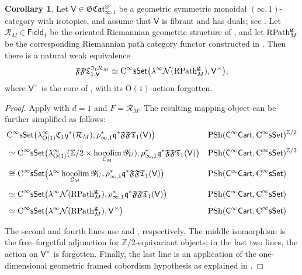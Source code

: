 \documentclass{amsart}
\newcommand{\cat}[1]{\mathsf{#1}}
\newcommand{\sset}{\cat{sSet}}
\newcommand{\nerve}{\mathcal{N}}
\newcommand{\we}{\simeq}
\DeclareMathOperator*{\hocolim}{hocolim}
\newcommand{\CsSet}{\textnormal{C}^{\infty}\sset}
\newcommand{\fieldnoniso}[1]{\cat{Field}_{#1}}
\newcommand{\Cart}{\cat{C}^{\infty}\cat{Cart}}
\newcommand{\FFT}{\mathfrak{FFT}}
\newcommand{\GCat}{\mathfrak{G}\mathfrak{Cat}}
\newcommand{\sheaf}[1]{\mathcal{#1}}
\newcommand{\psh}{\mathrm{PSh}}
\newcommand{\RM}{\sheaf{R}_{M}}
\newcommand{\CM}{{\sheaf{C}}_{M}}
\newcommand{\Cc}{\mathfrak{C}}
\newcommand{\ZZ}{{\mathbb{Z}}}
\newcommand{\rpathgermy}{{\mathrm{RPath}}^{\textnormal{\textbf{g}}}_{M}}
\newcommand{\Yo}{\mathscr{Y}}
\theoremstyle{definition}
\newtheorem{corollary}[equation]{Corollary}
\numberwithin{equation}{subsection}
\numberwithin{subsubsection}{subsection}
\begin{document}
\begin{corollary}\label{cor:one-dimensional.Riemannian.classification}
  Let \(\cat{V}\in\GCat_{\infty,1}^{\otimes}\) be a geometric
  symmetric monoidal \((\infty,1)\)-category with isotopies, and assume
  that \(\cat{V}\) is fibrant and has duals; see \cite[Section~2.3]{GP22}. Let
  \(\RM\in\fieldnoniso{1}\) be the oriented Riemannian geometric
  structure of , and let
  \(\rpathgermy\) be the corresponding Riemannian path category functor
  constructed in \cite[Definition~4.1.6]{KP26}.
  Then there is a natural weak equivalence
  \[
    \FFT_{1,\cat{V}}^{\mathfrak{I}_{1}\RM}
    \we
    \CsSet\bigl(
      \lambda^{\infty}\nerve(\rpathgermy),
      \cat{V}^{\times}
    \bigr),
  \]
  where \(\cat{V}^{\times}\) is the core of
  , with its \(\mathrm{O}(1)\)-action forgotten.
\end{corollary}

\begin{proof}
  Apply  with \(d=1\) and
  \(F=\RM\). The resulting mapping object can be further simplified as follows:
  \begin{align*}
    &\CsSet\bigl(\lambda^{\infty}_{\mathrm{O}(1)}
    \Cc_{1}q^{*}(\RM),\rho^{*}_{\infty,1}\mathfrak{q}^{*}\FFT_{1}(\cat{V})\bigr)
    &&\text{\(\psh(\Cart,\CsSet)^{\ZZ/2}\)} \\[1ex]
    &\we
    \CsSet\bigl(\lambda^{\infty}_{\mathrm{O}(1)}(\ZZ/2\times
    \hocolim_{\CM}\Yo_{U}),\rho^{*}_{\infty,1}\mathfrak{q}^{*}\FFT_{1}(\cat{V})\bigr)
    &&\text{\(\psh(\Cart,\CsSet)^{\ZZ/2}\)} \\[1ex]
    &\cong
    \CsSet\bigl(\lambda^{\infty}\hocolim_{\CM}\Yo_{U},
    \rho^{*}_{\infty,1}\mathfrak{q}^{*}\FFT_{1}(\cat{V})\bigr)
    &&\text{\(\psh(\Cart,\CsSet)\)} \\[1ex]
    &\we
    \CsSet\bigl(\lambda^{\infty}\nerve(\rpathgermy),
    \rho^{*}_{\infty,1}\mathfrak{q}^{*}\FFT_{1}(\cat{V})\bigr)
    &&\text{\(\psh(\Cart,\CsSet)\)} \\[1ex]
    &\we
    \CsSet\bigl(\lambda^{\infty}\nerve(\rpathgermy),
    \cat{V}^{\times}\bigr)
    &&\text{\(\psh(\Cart,\CsSet)\)}
  \end{align*}

  The second and fourth lines use
  \cite[Proposition~3.4.7]{KP26} and \cite[Theorem~4.2.1]{KP26},
  respectively. The middle isomorphism is the free--forgetful adjunction
  for \(\ZZ/2\)-equivariant objects; in the last two lines, the action
  on \(\cat{V}^{\times}\) is forgotten. Finally, the last line is an application
  of the one-dimensional geometric framed cobordism hypothesis as explained in
  .
\end{proof}
\end{document}
